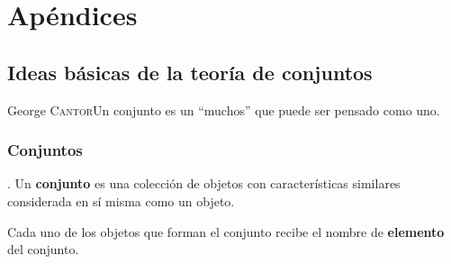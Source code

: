 \part[Apéndices]{Apéndices\\[7ex]}

	
	
\chapter{Ideas básicas de la teoría de conjuntos} 
\label{conjuntos}



	


\begin{cita}{George \textsc{Cantor}}{Un conjunto es un “muchos” que puede ser pensado como uno.}\end{cita}

\section{Conjuntos}\label{cjtos}

\begin{definition}
	. Un \textbf{conjunto} es una colección de objetos con características similares considerada en sí misma como un objeto.
	
	Cada uno de los objetos que forman el conjunto recibe el nombre de \textbf{elemento} del conjunto.
\end{definition}

